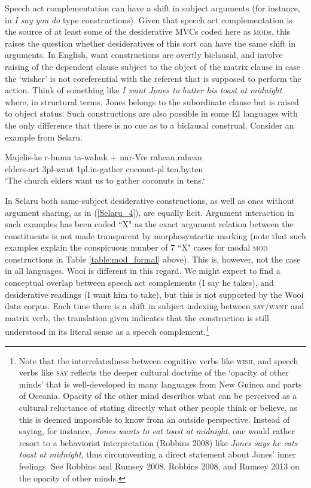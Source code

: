 Speech act complementation can have a shift in subject arguments (for instance, in \textit{I say you do} type constructions). Given that speech act complementation is the source of at least some of the desiderative MVCs coded here as \textsc{mod}s, this raises the question whether desideratives of this sort can have the same shift in arguments. In English, want constructions are overtly biclausal, and involve raising of the dependent clause subject to the object of the matrix clause in case the `wisher' is not coreferential with the referent that is supposed to perform the action. Think of something like \textit{I want Jones to butter his toast at midnight} where, in structural terms, Jones belongs to the subordinate clause but is raised to object status. Such constructions are also possible in some EI languages with the only difference that there is no cue as to a biclausal construal. Consider an example from Selaru.

\ea \label{Selaru_4}
\gll Majelis-ke r-buma ta-wahuk + nur-Vre rahean.rahean \\
elders-\acs{art} 3\acs{pl}-want 1\acs{pl}.\acs{in}-gather coconut-\acs{pl} ten.by.ten \\
\glft `The church elders want us to gather coconuts in tens.‘ \\ 
\z
\xe

In Selaru both same-subject desiderative constructions, as well as ones without argument sharing, as in (\ref{Selaru_4}), are equally licit. Argument interaction in such examples has been coded ``X" as the exact argument relation between the constituents is not made transparent by morphosyntactic marking (note that such examples explain the conspicuous number of 7 ``X" cases for modal \textsc{mod} constructions in Table \ref{table:mod_formal} above). This is, however, not the case in all languages. Wooi is different in this regard. We might expect to find a conceptual overlap between speech act complements (I say he takes), and desiderative readings (I want him to take), but this is not supported by the Wooi data corpus. Each time there is a shift in subject indexing between \textsc{say}/\textsc{want} and matrix verb, the translation given indicates that the construction is still understood in its literal sense as a speech complement.\footnote{Note that the interrelatedness between cognitive verbs like \textsc{wish}, and speech verbs like \textsc{say} reflects the deeper cultural doctrine of the `opacity of other minds' that is well-developed in many languages from New Guinea and parts of Oceania. Opacity of the other mind describes what can be perceived as a cultural reluctance of stating directly what other people think or believe, as this is deemed impossible to know from an outside perspective. Instead of saying, for instance, \textit{Jones wants to eat toast at midnight}, one would rather resort to a behaviorist interpretation (Robbins 2008) like \textit{Jones says he eats toast at midnight}, thus circumventing a direct statement about Jones' inner feelings. See Robbins and Rumsey 2008, Robbins 2008, and Rumsey 2013 on the opacity of other minds.}

